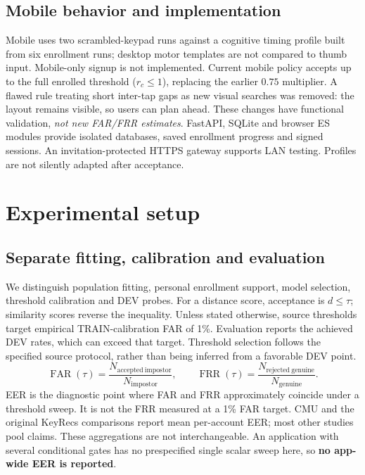 \documentclass[10pt,a4paper]{article}
\begin{document}
\subsection{Mobile behavior and implementation}
Mobile uses two scrambled-keypad runs against a cognitive timing profile built from six enrollment runs; desktop motor templates are not compared to thumb input. Mobile-only signup is not implemented. Current mobile policy accepts up to the full enrolled threshold ($r_c\leq1$), replacing the earlier $0.75$ multiplier. A flawed rule treating short inter-tap gaps as new visual searches was removed: the layout remains visible, so users can plan ahead. These changes have functional validation, \emph{not new FAR/FRR estimates}. FastAPI, SQLite and browser ES modules provide isolated databases, saved enrollment progress and signed sessions. An invitation-protected HTTPS gateway supports LAN testing. Profiles are not silently adapted after acceptance.

\newpage
\section{Experimental setup}
\subsection{Separate fitting, calibration and evaluation}
We distinguish population fitting, personal enrollment support, model selection, threshold calibration and DEV probes. For a distance score, acceptance is $d\leq\tau$; similarity scores reverse the inequality. Unless stated otherwise, source thresholds target empirical TRAIN-calibration FAR of 1\%. Evaluation reports the achieved DEV rates, which can exceed that target. Threshold selection follows the specified source protocol, rather than being inferred from a favorable DEV point.
\[
 \operatorname{FAR}(\tau)=\frac{N_{\mathrm{accepted\ impostor}}}{N_{\mathrm{impostor}}},\qquad
 \operatorname{FRR}(\tau)=\frac{N_{\mathrm{rejected\ genuine}}}{N_{\mathrm{genuine}}}.
\]
EER is the diagnostic point where FAR and FRR approximately coincide under a threshold sweep. It is not the FRR measured at a 1\% FAR target. CMU and the original KeyRecs comparisons report mean per-account EER; most other studies pool claims. These aggregations are not interchangeable. An application with several conditional gates has no prespecified single scalar sweep here, so \textbf{no app-wide EER is reported}.
\end{document}
